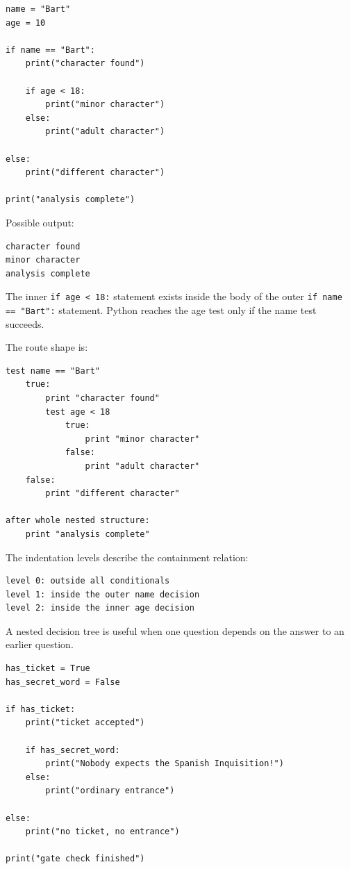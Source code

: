 \documentclass[a4paper,twoside]{report}
\begin{document}
\begin{verbatim}
name = "Bart"
age = 10

if name == "Bart":
    print("character found")

    if age < 18:
        print("minor character")
    else:
        print("adult character")

else:
    print("different character")

print("analysis complete")
\end{verbatim}

Possible output:

\begin{verbatim}
character found
minor character
analysis complete
\end{verbatim}

The inner \texttt{if age < 18:} statement exists inside the body of the outer \texttt{if name == "Bart":} statement. Python reaches the age test only if the name test succeeds.

The route shape is:

\begin{verbatim}
test name == "Bart"
    true:
        print "character found"
        test age < 18
            true:
                print "minor character"
            false:
                print "adult character"
    false:
        print "different character"

after whole nested structure:
    print "analysis complete"
\end{verbatim}

The indentation levels describe the containment relation:

\begin{verbatim}
level 0: outside all conditionals
level 1: inside the outer name decision
level 2: inside the inner age decision
\end{verbatim}

A nested decision tree is useful when one question depends on the answer to an earlier question.

\begin{verbatim}
has_ticket = True
has_secret_word = False

if has_ticket:
    print("ticket accepted")

    if has_secret_word:
        print("Nobody expects the Spanish Inquisition!")
    else:
        print("ordinary entrance")

else:
    print("no ticket, no entrance")

print("gate check finished")
\end{verbatim}
\end{document}
